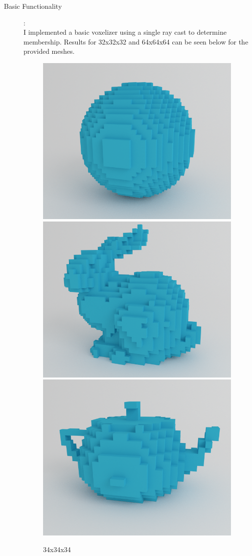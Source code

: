 \documentclass {article}
\begin{document}
	\newpage
	\begin{description}
		\item[Basic Functionality]:\\
		
		I implemented a basic voxelizer using a single ray cast to determine membership. Results for 32x32x32 and 64x64x64 can be seen below for the provided meshes. 
		
		\begin{figure}[ht!]
			\includegraphics[width=.3\textwidth]{../data/renders/sphere32}\hfill
			\includegraphics[width=.3\textwidth]{../data/renders/bunny32}\hfill
			\includegraphics[width=.3\textwidth]{../data/renders/teapot32}
			\caption{34x34x34}
		\end{figure}
		

\end{description}
\end{document}
